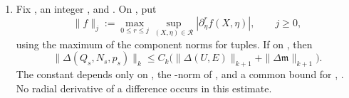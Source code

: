 \begin{lemma}
\begin{enumerate}[label=\textup{(\roman*)},leftmargin=2.5em]
\item Fix , an integer
, and . On
, put
\[
 \|f\|_j:=\max_{0\leq r\leq j}
           \sup_{(X,\eta)\in\mathcal R}|\partial_\eta^rf(X,\eta)|,
 \qquad j\geq0,
\]
using the maximum of the component norms for tuples. If
 on
, then
\begin{equation}
 \|\Delta(Q_s,N_s,p_s)\|_k
 \leq C_k\bigl(\|\Delta(U,E)\|_{k+1}
                 +\|\Delta\mathfrak m\|_{k+1}\bigr).
\tag{4.17}\label{eq:4.17}
\end{equation}
The constant  depends only on
, the
-norm of
, and a common bound for
,
. No radial derivative of a difference occurs in
this estimate.
\end{enumerate}
\end{lemma}

